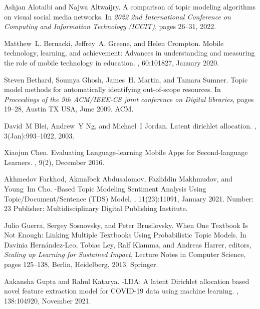 \begin{thebibliography}{10}
Ashjan Alotaibi and Najwa Altwaijry.
\newblock A comparison of topic modeling algorithms on visual social media
  networks.
\newblock In {\em 2022 2nd International Conference on Computing and
  Information Technology (ICCIT)}, pages 26--31, 2022.

Matthew~L. Bernacki, Jeffrey~A. Greene, and Helen Crompton.
\newblock Mobile technology, learning, and achievement: {Advances} in
  understanding and measuring the role of mobile technology in education.
, 60:101827, January 2020.

Steven Bethard, Soumya Ghosh, James~H. Martin, and Tamara Sumner.
\newblock Topic model methods for automatically identifying out-of-scope
  resources.
\newblock In {\em Proceedings of the 9th {ACM}/{IEEE}-{CS} joint conference on
  {Digital} libraries}, pages 19--28, Austin TX USA, June 2009. ACM.

David~M Blei, Andrew~Y Ng, and Michael~I Jordan.
\newblock Latent dirichlet allocation.
, 3(Jan):993--1022, 2003.

Xiaojun Chen.
\newblock Evaluating {Language}-learning {Mobile} {Apps} for {Second}-language
  {Learners}.
,
  9(2), December 2016.

Akhmedov Farkhod, Akmalbek Abdusalomov, Fazliddin Makhmudov, and Young~Im Cho.
-{Based} {Topic} {Modeling} {Sentiment} {Analysis} {Using}
  {Topic}/{Document}/{Sentence} ({TDS}) {Model}.
, 11(23):11091, January 2021.
\newblock Number: 23 Publisher: Multidisciplinary Digital Publishing Institute.

Julio Guerra, Sergey Sosnovsky, and Peter Brusilovsky.
\newblock When {One} {Textbook} {Is} {Not} {Enough}: {Linking} {Multiple}
  {Textbooks} {Using} {Probabilistic} {Topic} {Models}.
\newblock In Davinia Hernández-Leo, Tobias Ley, Ralf Klamma, and Andreas
  Harrer, editors, {\em Scaling up {Learning} for {Sustained} {Impact}},
  Lecture {Notes} in {Computer} {Science}, pages 125--138, Berlin, Heidelberg,
  2013. Springer.

Aakansha Gupta and Rahul Katarya.
-{LDA}: {A} latent {Dirichlet} allocation based novel feature
  extraction model for {COVID}-19 data using machine learning.
, 138:104920, November 2021.


\end{thebibliography}
